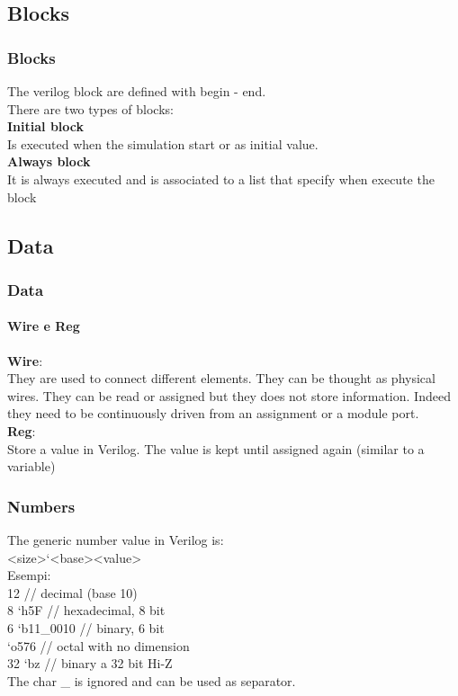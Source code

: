 \documentclass{beamer}
\begin{document}
\subsection{Blocks}

\begin{frame}\frametitle{Blocks}
The verilog block are defined with begin - end. \\
\pause
\vspace{0.3cm}
There are two types of blocks: \\
\pause
\vspace{0.3cm}
\textbf{Initial block} \\
Is executed when the simulation start or as initial value. \\
\pause
\vspace{0.3cm}
\textbf{Always block} \\
It is always executed and is associated to a list that specify when execute the block \\

\end{frame}

\subsection{Data}



\begin{frame}\frametitle{Data}\framesubtitle{Wire e Reg}
\textbf{Wire}:\\
They are used to connect different elements. They can be thought as physical wires. They can be read or assigned but they does not store information. 
Indeed they need to be continuously driven from an assignment or a module port. \\
\vspace{1cm}
\textbf{Reg}:\\
Store a value in Verilog. The value is kept until assigned again (similar to a variable) \\
\end{frame}

\begin{frame}\frametitle{Numbers}
The generic number value in Verilog is: \\
\textless size\textgreater \lq \textless base\textgreater \textless value\textgreater \\
\vspace{0.5cm}
Esempi: \\
12 // decimal (base 10) \\
8 \lq h5F // hexadecimal, 8 bit \\
6 \lq b11\_0010 // binary,  6 bit \\
\lq o576 // octal with no dimension \\
32 \lq bz // binary a 32 bit Hi-Z \\
\vspace{0.3cm}
The char \_ is ignored and can be used as separator.
\end{frame}
\end{document}
